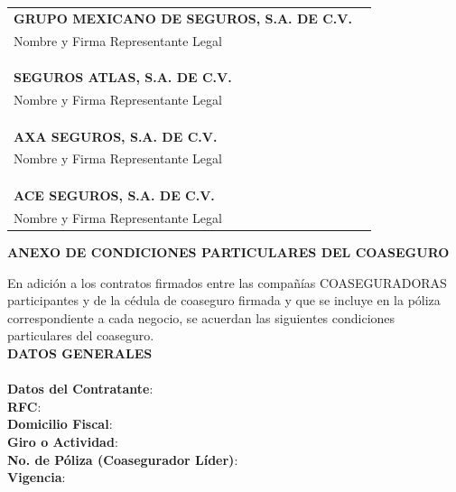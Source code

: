 \documentclass[letterpaper,10pt]{article}
\begin{document}
\begin{center}
    \begin{tabu} to \textwidth{X[l]r}
        \textbf{GRUPO MEXICANO DE SEGUROS, S.A. DE C.V.} &\\
        Nombre y Firma Representante Legal & \underline{\hspace{5cm}}\\\\\\\\
        \textbf{SEGUROS ATLAS, S.A. DE C.V.} &\\
        Nombre y Firma Representante Legal & \underline{\hspace{5cm}}\\\\\\\\
        \textbf{AXA SEGUROS, S.A. DE C.V.} &\\
        Nombre y Firma Representante Legal & \underline{\hspace{5cm}}\\\\\\\\
        \textbf{ACE SEGUROS, S.A. DE C.V.} &\\
        Nombre y Firma Representante Legal & \underline{\hspace{5cm}}
    \end{tabu}
\end{center}
\newpage

\begin{center}
    \textbf{ANEXO DE CONDICIONES PARTICULARES DEL COASEGURO}
\end{center}

En adición a los contratos firmados entre las compañías COASEGURADORAS participantes y de la cédula de coaseguro firmada y que se incluye en la póliza correspondiente a cada negocio, se acuerdan las siguientes condiciones particulares del coaseguro.\\

\textbf{DATOS GENERALES}\\\\
\textbf{Datos del Contratante}: \underline{\hspace{5cm}}\\
\textbf{RFC}: \underline{\hspace{5cm}}\\
\textbf{Domicilio Fiscal}: \underline{\hspace{5cm}}\\
\textbf{Giro o Actividad}: \underline{\hspace{5cm}}\\
\textbf{No. de Póliza (Coasegurador Líder)}: \underline{\hspace{5cm}}\\
\textbf{Vigencia}: \underline{\hspace{5cm}}\\
\end{document}
